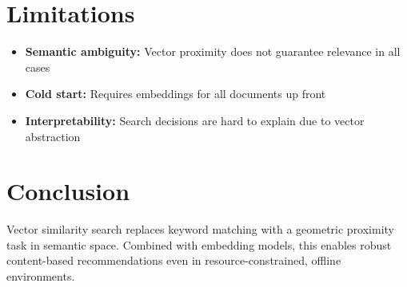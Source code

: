\section{Limitations}
\begin{itemize}
    \item \textbf{Semantic ambiguity:} Vector proximity does not guarantee relevance in all cases
    \item \textbf{Cold start:} Requires embeddings for all documents up front
    \item \textbf{Interpretability:} Search decisions are hard to explain due to vector abstraction
\end{itemize}

\section{Conclusion}
Vector similarity search replaces keyword matching with a geometric proximity task in semantic space. Combined with embedding models, this enables robust content-based recommendations even in resource-constrained, offline environments.
